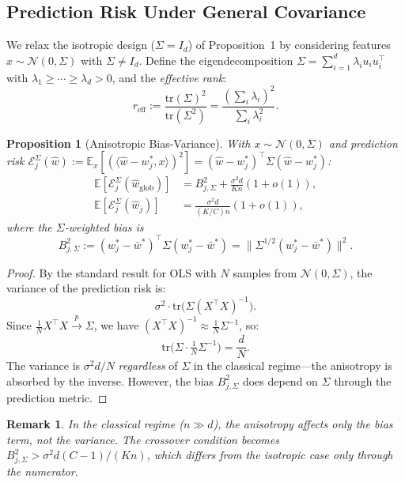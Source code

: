 \documentclass[11pt,a4paper]{article}
\newtheorem{proposition}[theorem]{Proposition}
\newtheorem{remark}[theorem]{Remark}
\newcommand{\E}{\mathbb{E}}
\newcommand{\tr}{\mathrm{tr}}
\newcommand{\what}{\hat{w}}
\newcommand{\wbar}{\bar{w}}
\newcommand{\Id}{I_d}
\begin{document}
\subsection{Prediction Risk Under General Covariance}

We relax the isotropic design ($\Sigma = \Id$) of Proposition~1 by considering features $x \sim \mathcal{N}(0, \Sigma)$ with $\Sigma \neq \Id$. Define the eigendecomposition $\Sigma = \sum_{i=1}^d \lambda_i u_i u_i^\top$ with $\lambda_1 \geq \cdots \geq \lambda_d > 0$, and the \emph{effective rank}:
\begin{equation}\label{eq:reff}
r_{\mathrm{eff}} := \frac{\tr(\Sigma)^2}{\tr(\Sigma^2)} = \frac{(\sum_i \lambda_i)^2}{\sum_i \lambda_i^2}.
\end{equation}

\begin{proposition}[Anisotropic Bias-Variance]\label{prop:aniso-bv}
With $x \sim \mathcal{N}(0, \Sigma)$ and prediction risk $\mathcal{E}_j^\Sigma(\what) := \E_x[(\langle \what - w_j^*, x\rangle)^2] = (\what - w_j^*)^\top \Sigma (\what - w_j^*)$:
\begin{align}
\E[\mathcal{E}_j^{\Sigma}(\what_{\mathrm{glob}})] &= B_{j,\Sigma}^2 + \frac{\sigma^2 d}{Kn}(1 + o(1)), \label{eq:aniso-global}\\
\E[\mathcal{E}_j^{\Sigma}(\what_j)] &= \frac{\sigma^2 d}{(K/C)n}(1 + o(1)), \label{eq:aniso-concept}
\end{align}
where the $\Sigma$-weighted bias is
\begin{equation}
B_{j,\Sigma}^2 := (w_j^* - \wbar^*)^\top \Sigma (w_j^* - \wbar^*) = \|\Sigma^{1/2}(w_j^* - \wbar^*)\|^2.
\end{equation}
\end{proposition}

\begin{proof}
By the standard result for OLS with $N$ samples from $\mathcal{N}(0, \Sigma)$, the variance of the prediction risk is:
\[
\sigma^2 \cdot \tr\bigl(\Sigma (X^\top X)^{-1}\bigr).
\]
Since $\frac{1}{N}X^\top X \xrightarrow{p} \Sigma$, we have $(X^\top X)^{-1} \approx \frac{1}{N}\Sigma^{-1}$, so:
\[
\tr\bigl(\Sigma \cdot \tfrac{1}{N}\Sigma^{-1}\bigr) = \frac{d}{N}.
\]
The variance is $\sigma^2 d/N$ \emph{regardless} of $\Sigma$ in the classical regime---the anisotropy is absorbed by the inverse. However, the bias $B_{j,\Sigma}^2$ does depend on $\Sigma$ through the prediction metric.
\end{proof}

\begin{remark}
In the classical regime ($n \gg d$), the anisotropy affects only the bias term, not the variance. The crossover condition becomes $B_{j,\Sigma}^2 > \sigma^2 d(C-1)/(Kn)$, which differs from the isotropic case only through the numerator.
\end{remark}
\end{document}
